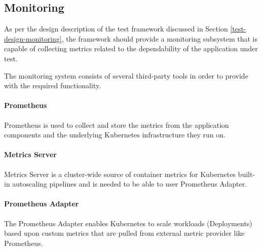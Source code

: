 \subsection{Monitoring} \label{test-impl-monitoring}

%	
%	

As per the design description of the test framework discussed in Section \ref{test-design-monitoring}, the framework should provide a monitoring subsystem that is capable of collecting metrics related to the dependability of the application under test.

The monitoring system consists of several third-party tools in order to provide with the required functionality.

\paragraph{Prometheus} Prometheus is used to collect and store the metrics from the application components and the underlying Kubernetes infrastructure they run on.

\paragraph{Metrics Server} Metrics Server is a cluster-wide source of container metrics for Kubernetes built-in autoscaling pipelines and is needed to be able to user Prometheus Adapter.

\paragraph{Prometheus Adapter} The Prometheus Adapter enables Kubernetes to scale workloads (\eg Deployments) based upon custom metrics that are pulled from external metric provider like Prometheus.

